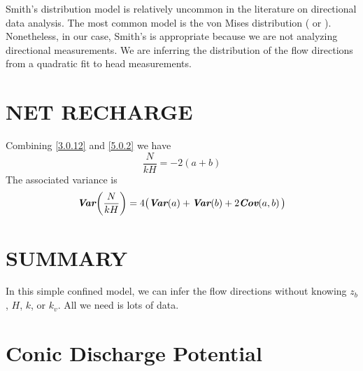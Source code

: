 \documentclass[12pt]{report}
\newcommand{\var}[1]{\ensuremath{\text{\textbf{\textit{Var}}}\negmedspace\left(#1\right)}}
\newcommand{\cov}[1]{\ensuremath{\text{\textbf{\textit{Cov}}}\negmedspace\left(#1\right)}}
\begin{document}
Smith's distribution model is relatively uncommon in the literature on directional data analysis. The most common model is the von Mises distribution (\citet{Mardia1972} or \citet{Watson1983}). Nonetheless, in our case, Smith's is appropriate because we are not analyzing directional measurements. We are inferring the distribution of the flow directions from a quadratic fit to head measurements.


\chapter{NET RECHARGE}
Combining \eqref{3.0.12} and \eqref{5.0.2} we have
%
\begin{equation}\label{7.0.1}
    \frac{N}{kH} = -2(a + b)
\end{equation}
%
The associated variance is
%
\begin{equation}\label{7.0.2}
    \var{\frac{N}{kH}} = 4 \big( \var{a} + \var{b} + 2 \cov{a, b} \big)
\end{equation}


\chapter{SUMMARY}
\vspace{0.2in}
\begin{tcolorbox}
{\Large In this simple confined model, we can infer the flow directions without knowing $z_b$, $H$, $k$, or $k_v$. All we need is lots of data.}
\end{tcolorbox}


\newpage




\newpage
\appendix

\chapter{Conic Discharge Potential}\label{9.0.1}
\end{document}

